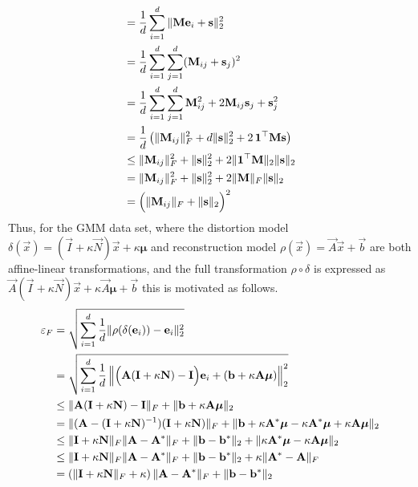 \begin{align*}
    &= \frac 1 d \sum_{i=1}^d \|\vec M \vec e_i + \vec s\|^2_2 \\
    &= \frac 1 d \sum_{i=1}^d \sum_{j=1}^d ( \vec M_{ij} + \vec s_j )^2 \\
    &= \frac 1 d \sum_{i=1}^d \sum_{j=1}^d \vec M_{ij}^2 + 2 \vec M_{ij} \vec s_j + \vec s_j^2 \\
    &= \frac 1 d \left (\| \vec M_{ij} \|_F^2 + d \| \vec s \|_2^2 + 2 \, \vec 1^\top \vec M \vec s \right )\\
    &\leq \| \vec M_{ij} \|_F^2 + \| \vec s \|_2^2 + 2 \|\vec 1^\top \vec M\|_2 \|\vec s\|_2\\
    &= \| \vec M_{ij} \|_F^2 + \| \vec s \|_2^2 + 2 \|\vec M\|_F \|\vec s\|_2\\
    &= \Bigl ( \| \vec M_{ij} \|_F + \| \vec s \|_2 \Bigr )^2
\end{align*}
Thus, for the GMM data set, where the distortion model $\delta(\vec x) = (\vec I + \kappa \vec N) \vec x + \kappa \boldsymbol \mu$
and reconstruction model $\rho(\vec x) = \vec A \vec x + \vec b$ are both 
affine-linear transformations, and the full transformation $\rho \circ \delta$ 
is expressed as $\vec A (\vec I + \kappa \vec N) \vec x + \kappa \vec A \boldsymbol \mu + \vec b$
this is motivated as follows.
\begin{align*}
    \varepsilon_F 
    &= \sqrt{ \sum_{i=1}^d \frac 1 d \|\rho(\delta (\vec e_i)) - \vec e_i \|_2^2 } \\
    &= \sqrt{ \sum_{i=1}^d \frac 1 d \left \| \Bigl ( \vec A (\vec I + \kappa \vec N) - \vec I \Bigr )\vec e_i 
        + (\vec b + \kappa \vec A \boldsymbol \mu ) \right \|_2^2} \\
    &\leq \| \vec A (\vec I + \kappa \vec N) - \vec I \|_F
        + \| \vec b + \kappa \vec A \boldsymbol \mu \|_2 \\
    &= \|(\vec A  - (\vec I + \kappa \vec N)^{-1})  (\vec I + \kappa \vec N)\|_F
        + \| \vec b + \kappa \vec A^* \boldsymbol \mu - \kappa \vec A^* \boldsymbol \mu + \kappa \vec A \boldsymbol \mu \|_2 \\
    &\leq \| \vec I + \kappa \vec N \|_F \|\vec A  - \vec A^* \|_F
        + \| \vec b - \vec b^*\|_2 + \| \kappa \vec A^* \boldsymbol \mu - \kappa \vec A \boldsymbol \mu \|_2 \\
    &\leq \| \vec I + \kappa \vec N \|_F \|\vec A  - \vec A^* \|_F
        + \| \vec b - \vec b^*\|_2 + \kappa \| \vec A^* - \vec A \|_F \\
    &= \left (\| \vec I + \kappa \vec N\|_F  + \kappa \right ) \|\vec A  - \vec A^* \|_F
        + \| \vec b - \vec b^*\|_2 \\
\end{align*}

